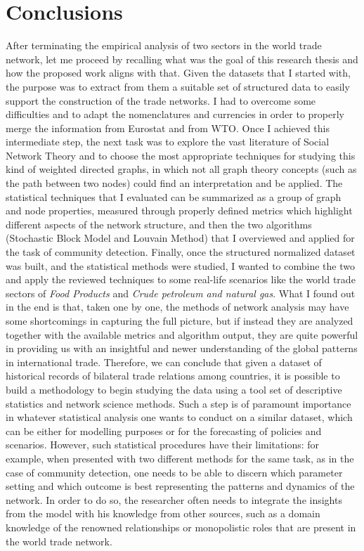 \chapter{Conclusions}\label{ch:5conclusions}

After terminating the empirical analysis of two sectors in the world trade network, let me proceed by recalling what was the goal of this research thesis and how the proposed work aligns with that.
Given the datasets that I started with, the purpose was to extract from them a suitable set of structured data to easily support the construction of the trade networks. I had to overcome some difficulties and to adapt the nomenclatures and currencies in order to properly merge the information from Eurostat and from WTO. Once I achieved this intermediate step, the next task was to explore the vast literature of Social Network Theory and to choose the most appropriate techniques for studying this kind of weighted directed graphs, in which not all graph theory concepts (such as the path between two nodes) could find an interpretation and be applied. The statistical techniques that I evaluated can be summarized as a group of graph and node properties, measured through properly defined metrics which highlight different aspects of the network structure, and then the two algorithms (Stochastic Block Model and Louvain Method) that I overviewed and applied for the task of community detection. Finally, once the structured normalized dataset was built, and the statistical methods were studied, I wanted to combine the two and apply the reviewed techniques to some real-life scenarios like the world trade sectors of \textit{Food Products} and \textit{Crude petroleum and natural gas}. What I found out in the end is that, taken one by one, the methods of network analysis may have some shortcomings in capturing the full picture, but if instead they are analyzed together with the available metrics and algorithm output, they are quite powerful in providing us with an insightful and newer understanding of the global patterns in international trade.
Therefore, we can conclude that given a dataset of historical records of bilateral trade relations among countries, it is possible to build a methodology to begin studying the data using a tool set of descriptive statistics and network science methods. Such a step is of paramount importance in whatever statistical analysis one wants to conduct on a similar dataset, which can be either for modelling purposes or for the forecasting of policies and scenarios. 
However, such statistical procedures have their limitations: for example, when presented with two different methods for the same task, as in the case of community detection, one needs to be able to discern which parameter setting and which outcome is best representing the patterns and dynamics of the network. In order to do so, the researcher often needs to integrate the insights from the model with his knowledge from other sources, such as a domain knowledge of the renowned relationships or monopolistic roles that are present in the world trade network.

